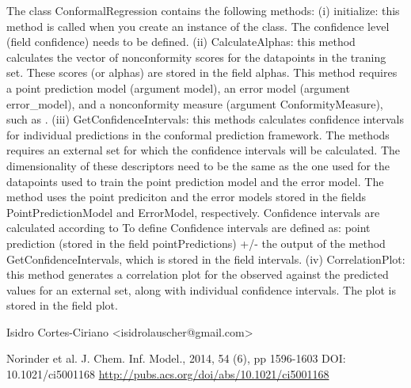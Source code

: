 \documentclass[a4paper]{book}
\begin{document}
\begin{Details}
The class ConformalRegression contains the following methods:
(i) initialize: this method is called when you create an instance of the class. The confidence level (field confidence) needs to be defined.
(ii) CalculateAlphas: this method calculates the vector of nonconformity scores for the datapoints in the traning set. These scores (or alphas) are stored in the field alphas. This method requires a point prediction model (argument model),
an error model (argument error\_model), and a nonconformity measure (argument ConformityMeasure), such as .
(iii) GetConfidenceIntervals: this methods calculates confidence intervals for individual predictions in the conformal prediction framework. The methods requires an external set for which the confidence intervals will be calculated.
The dimensionality of these descriptors need to be the same as the one used for the datapoints used to train the point prediction model and the error model. 
The method uses the point prediciton and the error models stored in the fields PointPredictionModel and ErrorModel, respectively.
Confidence intervals are calculated according to To define 
Confidence intervals are defined as: point prediction (stored in the field pointPredictions) +/-  the output of the method GetConfidenceIntervals, which is stored in the field intervals.
(iv) CorrelationPlot: this method generates a correlation plot for the observed against the predicted values for an external set, along with individual confidence intervals. 
The plot is stored in the field plot.
\end{Details}
%
\begin{Author}\relax
Isidro Cortes-Ciriano <isidrolauscher@gmail.com>
\end{Author}
%
\begin{References}\relax
Norinder et al. J. Chem. Inf. Model., 2014, 54 (6), pp 1596-1603
DOI: 10.1021/ci5001168
\url{http://pubs.acs.org/doi/abs/10.1021/ci5001168}
\end{References}
%
\begin{SeeAlso}\relax
{}
\end{SeeAlso}
%
\end{document}
